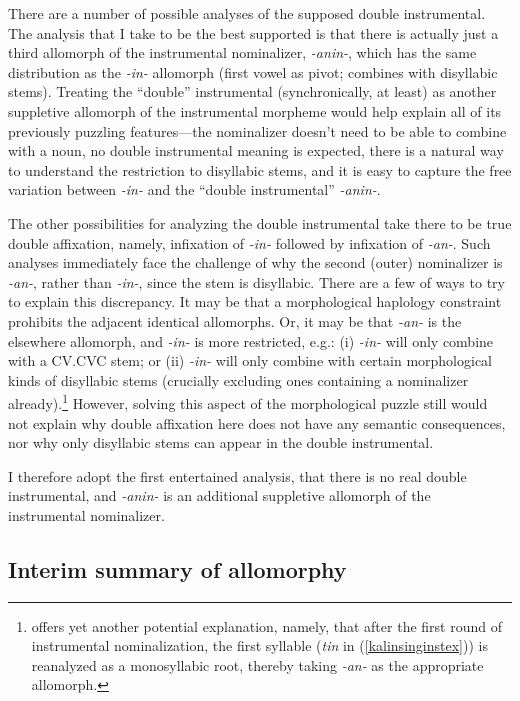 \documentclass[output=paper,colorlinks,citecolor=brown,
]{langscibook}
\begin{document}
There are a number of possible analyses of the supposed double instrumental. The analysis that I take to be the best supported is that there is actually just a third allomorph of the instrumental nominalizer, \textit{-anin-}, which has the same distribution as the \textit{-in-} allomorph (first vowel as pivot; combines with disyllabic stems). Treating the ``double'' instrumental (synchronically, at least) as another suppletive allomorph of the instrumental morpheme would help explain all of its previously puzzling features---the nominalizer doesn't need to be able to combine with a noun, no double instrumental meaning is expected, there is a natural way to understand the restriction to disyllabic stems, and it is easy to capture the free variation between \textit{-in-} and the ``double instrumental'' \textit{-anin-}.

The other possibilities for analyzing the double instrumental take there to be true double affixation, namely, infixation of \textit{-in-} followed by infixation of \textit{-an-}. Such analyses immediately face the challenge of why the second (outer)  nominalizer is \textit{-an-}, rather than \textit{-in-}, since the stem is disyllabic. There are a few of ways to try to explain this discrepancy. It may be that a morphological haplology constraint prohibits the adjacent identical allomorphs. Or, it may be that \textit{-an-} is the elsewhere allomorph, and \textit{-in-} is more restricted, e.g.: (i) \textit{-in-} will only combine with a CV.CVC stem; or (ii) \textit{-in-} will only combine with certain morphological kinds of disyllabic stems (crucially excluding ones containing a nominalizer already).\footnote{\citet[64]{Rad81} offers yet another potential explanation, namely, that after the first round of instrumental nominalization, the first syllable (\textit{tin} in (\ref{kalinsinginstex})) is reanalyzed as a monosyllabic root, thereby taking \textit{-an-} as the appropriate allomorph.}  However, solving this aspect of the morphological puzzle still would not explain why double affixation here does not have any semantic consequences, nor why only disyllabic stems can appear in the double instrumental. 

I therefore adopt the first entertained analysis, that there is no real double instrumental, and \textit{-anin-} is an additional suppletive allomorph of the instrumental nominalizer.

\subsection{Interim summary of allomorphy}\label{kalinallosec}
\end{document}
